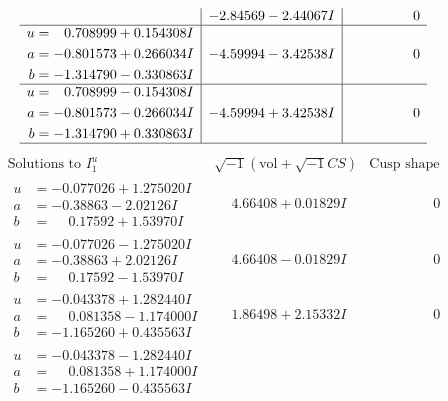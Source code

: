 \documentclass[1p]{elsarticle_modified}
\theoremstyle{definition}
\newcommand{\I}{\sqrt{-1}}
\begin{document}
$$\begin{array}{c|c|c}
 & -2.84569 - 2.44067 I & \phantom{-0.000000 } 0 \\ \hline\begin{aligned}
u &= \phantom{-}0.708999 + 0.154308 I \\
a &= -0.801573 + 0.266034 I \\
b &= -1.314790 - 0.330863 I\end{aligned}
 & -4.59994 - 3.42538 I & \phantom{-0.000000 } 0 \\ \hline\begin{aligned}
u &= \phantom{-}0.708999 - 0.154308 I \\
a &= -0.801573 - 0.266034 I \\
b &= -1.314790 + 0.330863 I\end{aligned}
 & -4.59994 + 3.42538 I & \phantom{-0.000000 } 0\\
 \hline 
 \end{array}$$\newpage$$\begin{array}{c|c|c}  
\text{Solutions to }I^u_{1}& \I (\text{vol} + \sqrt{-1}CS) & \text{Cusp shape}\\
 \hline 
\begin{aligned}
u &= -0.077026 + 1.275020 I \\
a &= -0.38863 - 2.02126 I \\
b &= \phantom{-}0.17592 + 1.53970 I\end{aligned}
 & \phantom{-}4.66408 + 0.01829 I & \phantom{-0.000000 } 0 \\ \hline\begin{aligned}
u &= -0.077026 - 1.275020 I \\
a &= -0.38863 + 2.02126 I \\
b &= \phantom{-}0.17592 - 1.53970 I\end{aligned}
 & \phantom{-}4.66408 - 0.01829 I & \phantom{-0.000000 } 0 \\ \hline\begin{aligned}
u &= -0.043378 + 1.282440 I \\
a &= \phantom{-}0.081358 - 1.174000 I \\
b &= -1.165260 + 0.435563 I\end{aligned}
 & \phantom{-}1.86498 + 2.15332 I & \phantom{-0.000000 } 0 \\ \hline\begin{aligned}
u &= -0.043378 - 1.282440 I \\
a &= \phantom{-}0.081358 + 1.174000 I \\
b &= -1.165260 - 0.435563 I\end{aligned}

\end{array}$$
\end{document}
